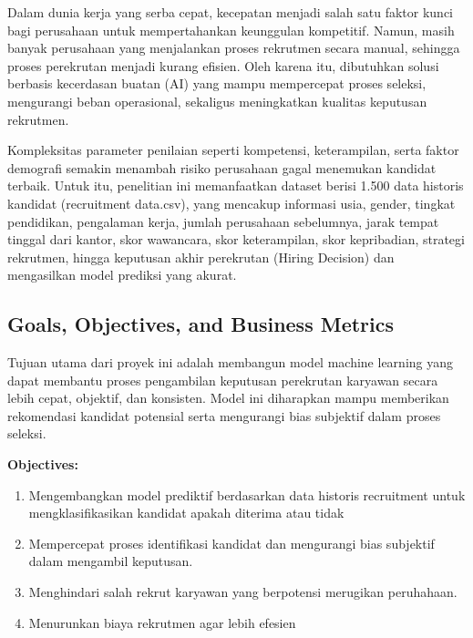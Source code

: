 Dalam dunia kerja yang serba cepat, kecepatan menjadi salah satu faktor kunci bagi perusahaan untuk mempertahankan keunggulan kompetitif. Namun, masih banyak perusahaan yang menjalankan proses rekrutmen secara manual, sehingga proses perekrutan menjadi kurang efisien. Oleh karena itu, dibutuhkan solusi berbasis kecerdasan buatan (AI) yang mampu mempercepat proses seleksi, mengurangi beban operasional, sekaligus meningkatkan kualitas keputusan rekrutmen.

Kompleksitas parameter penilaian seperti kompetensi, keterampilan, serta faktor demografi semakin menambah risiko perusahaan gagal menemukan kandidat terbaik. Untuk itu, penelitian ini memanfaatkan dataset berisi 1.500 data historis kandidat (recruitment data.csv), yang mencakup informasi usia, gender, tingkat pendidikan, pengalaman kerja, jumlah perusahaan sebelumnya, jarak tempat tinggal dari kantor, skor wawancara, skor keterampilan, skor kepribadian, strategi rekrutmen, hingga keputusan akhir perekrutan (Hiring Decision) dan mengasilkan model prediksi yang akurat.



\subsection{Goals, Objectives, and Business Metrics}

Tujuan utama dari proyek ini adalah membangun model machine learning yang dapat membantu proses pengambilan keputusan perekrutan karyawan secara lebih cepat, objektif, dan konsisten. Model ini diharapkan mampu memberikan rekomendasi kandidat potensial serta mengurangi bias subjektif dalam proses seleksi.

\textbf{Objectives:}
\begin{enumerate}
    \item Mengembangkan model prediktif berdasarkan data historis recruitment untuk mengklasifikasikan kandidat apakah diterima atau tidak
    \item Mempercepat proses identifikasi kandidat dan mengurangi bias subjektif  dalam mengambil keputusan.
    \item Menghindari salah rekrut karyawan yang berpotensi merugikan peruhahaan.
    \item Menurunkan biaya rekrutmen agar lebih efesien
\end{enumerate}

